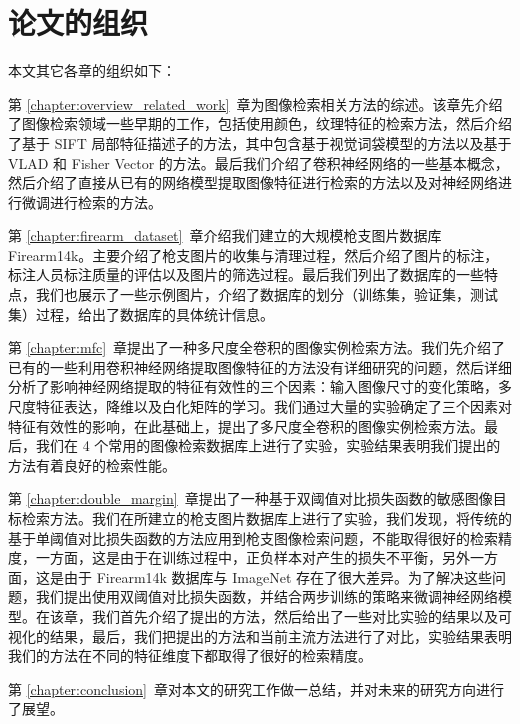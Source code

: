 \section{论文的组织}
本文其它各章的组织如下：

第 \ref{chapter:overview_related_work}~章为图像检索相关方法的综述。该章先介绍了图像检索领域一些早期的工作，包括使用颜色，纹理特征的检索方法，然后介绍了基于 SIFT 局部特征描述子的方法，其中包含基于视觉词袋模型的方法以及基于 VLAD 和 Fisher Vector 的方法。最后我们介绍了卷积神经网络的一些基本概念，然后介绍了直接从已有的网络模型提取图像特征进行检索的方法以及对神经网络进行微调进行检索的方法。

第 \ref{chapter:firearm_dataset}~章介绍我们建立的大规模枪支图片数据库 Firearm14k。主要介绍了枪支图片的收集与清理过程，然后介绍了图片的标注，标注人员标注质量的评估以及图片的筛选过程。最后我们列出了数据库的一些特点，我们也展示了一些示例图片，介绍了数据库的划分（训练集，验证集，测试集）过程，给出了数据库的具体统计信息。

第 \ref{chapter:mfc}~章提出了一种多尺度全卷积的图像实例检索方法。我们先介绍了已有的一些利用卷积神经网络提取图像特征的方法没有详细研究的问题，然后详细分析了影响神经网络提取的特征有效性的三个因素：输入图像尺寸的变化策略，多尺度特征表达，降维以及白化矩阵的学习。我们通过大量的实验确定了三个因素对特征有效性的影响，在此基础上，提出了多尺度全卷积的图像实例检索方法。最后，我们在 4 个常用的图像检索数据库上进行了实验，实验结果表明我们提出的方法有着良好的检索性能。

第 \ref{chapter:double_margin}~章提出了一种基于双阈值对比损失函数的敏感图像目标检索方法。我们在所建立的枪支图片数据库上进行了实验，我们发现，将传统的基于单阈值对比损失函数的方法应用到枪支图像检索问题，不能取得很好的检索精度，一方面，这是由于在训练过程中，正负样本对产生的损失不平衡，另外一方面，这是由于 Firearm14k 数据库与 ImageNet 存在了很大差异。为了解决这些问题，我们提出使用双阈值对比损失函数，并结合两步训练的策略来微调神经网络模型。在该章，我们首先介绍了提出的方法，然后给出了一些对比实验的结果以及可视化的结果，最后，我们把提出的方法和当前主流方法进行了对比，实验结果表明我们的方法在不同的特征维度下都取得了很好的检索精度。

第 \ref{chapter:conclusion}~章对本文的研究工作做一总结，并对未来的研究方向进行了展望。
